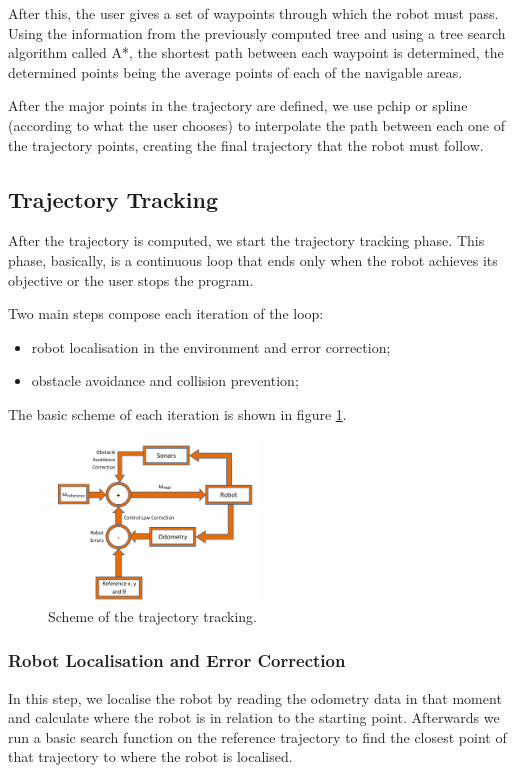 \documentclass[11pt,a4paper]{scrartcl}
\begin{document}
After this, the user gives a set of waypoints through which the robot must pass. Using the information from the previously computed tree and using a tree search algorithm called A*, the shortest path between each waypoint is determined, the determined points being the average points of each of the navigable areas.

After the major points in the trajectory are defined, we use pchip or spline (according to what the user chooses) to interpolate the path between each one of the trajectory points, creating the final trajectory that the robot must follow.

\subsection{Trajectory Tracking}
After the trajectory is computed, we start the trajectory tracking phase. This phase, basically, is a continuous loop that ends only when the robot achieves its objective or the user stops the program.

 Two main steps compose each iteration of the loop:
	\begin{itemize}
		\item robot localisation in the environment and error correction;
        \item obstacle avoidance and collision prevention;
	\end{itemize}

The basic scheme of each iteration is shown in figure \ref{fig:Tracking_Scheme}.

  \begin{figure}[H]
  	  \centerline{\includegraphics[width=0.5\textwidth]{Scheme.pdf}}
      \caption{Scheme of the trajectory tracking.}
      \label{fig:Tracking_Scheme}
  \end{figure}

\subsubsection{Robot Localisation and Error Correction}
In this step, we localise the robot by reading the odometry data in that moment and calculate where the robot is in relation to the starting point. Afterwards we run a basic search function on the reference trajectory to find the closest point of that trajectory to where the robot is localised.
\end{document}
